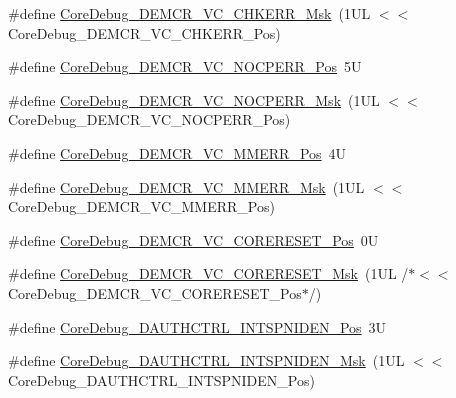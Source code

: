\begin{DoxyCompactItemize}
\item 
\#define \mbox{\hyperlink{group___c_m_s_i_s___core_debug_ga2f98b461d19746ab2febfddebb73da6f}{Core\+Debug\+\_\+\+D\+E\+M\+C\+R\+\_\+\+V\+C\+\_\+\+C\+H\+K\+E\+R\+R\+\_\+\+Msk}}~(1\+U\+L $<$$<$ Core\+Debug\+\_\+\+D\+E\+M\+C\+R\+\_\+\+V\+C\+\_\+\+C\+H\+K\+E\+R\+R\+\_\+\+Pos)
\item 
\#define \mbox{\hyperlink{group___c_m_s_i_s___core_debug_gac9d13eb2add61f610d5ced1f7ad2adf8}{Core\+Debug\+\_\+\+D\+E\+M\+C\+R\+\_\+\+V\+C\+\_\+\+N\+O\+C\+P\+E\+R\+R\+\_\+\+Pos}}~5U
\item 
\#define \mbox{\hyperlink{group___c_m_s_i_s___core_debug_ga03ee58b1b02fdbf21612809034562f1c}{Core\+Debug\+\_\+\+D\+E\+M\+C\+R\+\_\+\+V\+C\+\_\+\+N\+O\+C\+P\+E\+R\+R\+\_\+\+Msk}}~(1\+U\+L $<$$<$ Core\+Debug\+\_\+\+D\+E\+M\+C\+R\+\_\+\+V\+C\+\_\+\+N\+O\+C\+P\+E\+R\+R\+\_\+\+Pos)
\item 
\#define \mbox{\hyperlink{group___c_m_s_i_s___core_debug_ga444454f7c7748e76cd76c3809c887c41}{Core\+Debug\+\_\+\+D\+E\+M\+C\+R\+\_\+\+V\+C\+\_\+\+M\+M\+E\+R\+R\+\_\+\+Pos}}~4U
\item 
\#define \mbox{\hyperlink{group___c_m_s_i_s___core_debug_gad420a9b60620584faaca6289e83d3a87}{Core\+Debug\+\_\+\+D\+E\+M\+C\+R\+\_\+\+V\+C\+\_\+\+M\+M\+E\+R\+R\+\_\+\+Msk}}~(1\+U\+L $<$$<$ Core\+Debug\+\_\+\+D\+E\+M\+C\+R\+\_\+\+V\+C\+\_\+\+M\+M\+E\+R\+R\+\_\+\+Pos)
\item 
\#define \mbox{\hyperlink{group___c_m_s_i_s___core_debug_ga9fcf09666f7063a7303117aa32a85d5a}{Core\+Debug\+\_\+\+D\+E\+M\+C\+R\+\_\+\+V\+C\+\_\+\+C\+O\+R\+E\+R\+E\+S\+E\+T\+\_\+\+Pos}}~0U
\item 
\#define \mbox{\hyperlink{group___c_m_s_i_s___core_debug_ga906476e53c1e1487c30f3a1181df9e30}{Core\+Debug\+\_\+\+D\+E\+M\+C\+R\+\_\+\+V\+C\+\_\+\+C\+O\+R\+E\+R\+E\+S\+E\+T\+\_\+\+Msk}}~(1\+U\+L /$\ast$$<$$<$ Core\+Debug\+\_\+\+D\+E\+M\+C\+R\+\_\+\+V\+C\+\_\+\+C\+O\+R\+E\+R\+E\+S\+E\+T\+\_\+\+Pos$\ast$/)
\item 
\#define \mbox{\hyperlink{group___c_m_s_i_s___core_debug_gaf733a36e6b4717a604f7d77c05dfceb4}{Core\+Debug\+\_\+\+D\+A\+U\+T\+H\+C\+T\+R\+L\+\_\+\+I\+N\+T\+S\+P\+N\+I\+D\+E\+N\+\_\+\+Pos}}~3U
\item 
\#define \mbox{\hyperlink{group___c_m_s_i_s___core_debug_gadad0bf68d32cba49c1ea7534122c2752}{Core\+Debug\+\_\+\+D\+A\+U\+T\+H\+C\+T\+R\+L\+\_\+\+I\+N\+T\+S\+P\+N\+I\+D\+E\+N\+\_\+\+Msk}}~(1\+U\+L $<$$<$ Core\+Debug\+\_\+\+D\+A\+U\+T\+H\+C\+T\+R\+L\+\_\+\+I\+N\+T\+S\+P\+N\+I\+D\+E\+N\+\_\+\+Pos)
\item 

\end{DoxyCompactItemize}
